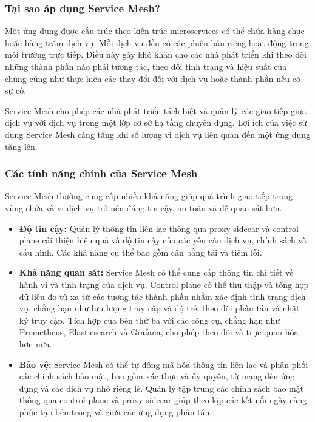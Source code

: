 \documentclass[12pt,a4paper]{report}
\begin{document}
		\subsubsection{Tại sao áp dụng Service Mesh?}
		\hspace{0.6cm}Một ứng dụng được cấu trúc theo kiến trúc microservices có thể chứa hàng chục hoặc hàng trăm dịch vụ, Mỗi dịch vụ đều có các phiên bản riêng hoạt động trong môi trường trực tiếp. Điều này gây khó khăn cho các nhà phát triển khi theo dõi những thành phần nào phải tương tác, theo dõi tình trạng và hiệu suất của chúng cũng như thực hiện các thay đổi đối với dịch vụ hoặc thành phần nếu có sự cố.
		
		Service Mesh cho phép các nhà phát triển tách biệt và quản lý các giao tiếp giữa dịch vụ với dịch vụ trong một lớp cơ sở hạ tầng chuyên dụng. Lợi ích của việc sử dụng Service Mesh càng tăng khi số lượng vi dịch vụ liên quan đến một ứng dụng tăng lên.
		
			\subsubsection{Các tính năng chính của Service Mesh}
		\hspace{0.6cm}Service Mesh thường cung cấp nhiều khả năng giúp quá trình giao tiếp trong vùng chứa và vi dịch vụ trở nên đáng tin cậy, an toàn và dễ quan sát hơn.
		\begin{itemize}
			\item \textbf{Độ tin cậy:} Quản lý thông tin liên lạc thông qua proxy sidecar và control plane cải thiện hiệu quả và độ tin cậy của các yêu cầu dịch vụ, chính sách và cấu hình. Các khả năng cụ thể bao gồm cân bằng tải và tiêm lỗi.
			\item \textbf{Khả năng quan sát:} Service Mesh có thể cung cấp thông tin chi tiết về hành vi và tình trạng của dịch vụ. Control plane có thể thu thập và tổng hợp dữ liệu đo từ xa từ các tương tác thành phần nhằm xác định tình trạng dịch vụ, chẳng hạn như lưu lượng truy cập và độ trễ, theo dõi phân tán và nhật ký truy cập. Tích hợp của bên thứ ba với các công cụ, chẳng hạn như Prometheus, Elasticsearch và Grafana, cho phép theo dõi và trực quan hóa hơn nữa.
			\item \textbf{Bảo vệ:} Service Mesh có thể tự động mã hóa thông tin liên lạc và phân phối các chính sách bảo mật, bao gồm xác thực và ủy quyền, từ mạng đến ứng dụng và các dịch vụ nhỏ riêng lẻ. Quản lý tập trung các chính sách bảo mật thông qua control plane và proxy sidecar giúp theo kịp các kết nối ngày càng phức tạp bên trong và giữa các ứng dụng phân tán.
		\end{itemize}
		
\end{document}
